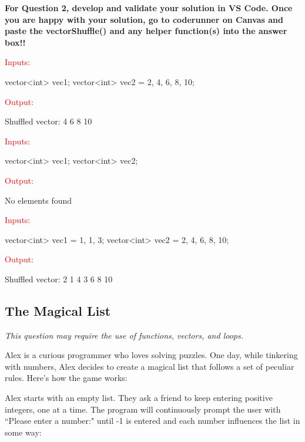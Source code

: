\textbf{For Question 2, develop and validate your solution in VS Code. Once you are happy with your solution, go to coderunner on Canvas and paste the vectorShuffle() and any helper function(s) into the answer box!!}

\begin{sample}
\textcolor{red}{Inputs:}

vector<int> vec1; \newline
vector<int> vec2 = {2, 4, 6, 8, 10};

\textcolor{red}{Output:}

Shuffled vector:  4 6 8 10

\end{sample}


\begin{sample}
\textcolor{red}{Inputs:}

vector<int> vec1; \newline
vector<int> vec2;

\textcolor{red}{Output:}

No elements found

\end{sample}
\begin{sample}
\textcolor{red}{Inputs:}

vector<int> vec1 = {1, 1, 3};\newline
vector<int> vec2 = {2, 4, 6, 8, 10};

\textcolor{red}{Output:}

Shuffled vector:  2 1 4 3 6 8 10

\end{sample}


\subsection{The Magical List}  
\textit{This question may require the use of functions, vectors, and loops.}

Alex is a curious programmer who loves solving puzzles. One day, while tinkering with numbers, Alex decides to create a magical list that follows a set of peculiar rules. Here's how the game works:

Alex starts with an empty list. They ask a friend to keep entering positive integers, one at a time. The program will continuously prompt the user with ``Please enter a number:" until -1 is entered and each number influences the list in some way:


